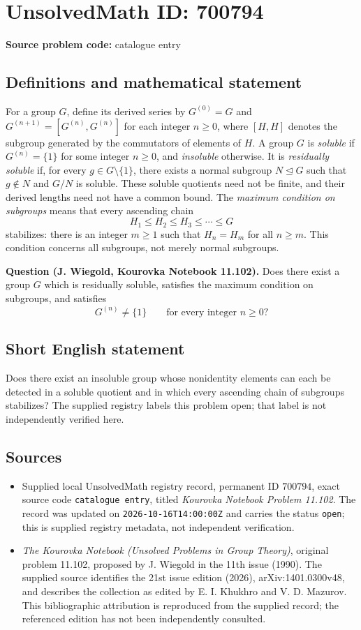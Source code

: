 \documentclass[11pt]{article}
\begin{document}
\section*{UnsolvedMath ID: 700794}
\textbf{Source problem code:} catalogue entry
\subsection{Definitions and mathematical statement}
For a group \(G\), define its derived series by \(G^{(0)}=G\) and \(G^{(n+1)}=[G^{(n)},G^{(n)}]\) for each integer \(n\geq 0\), where \([H,H]\) denotes the subgroup generated by the commutators of elements of \(H\). A group \(G\) is \emph{soluble} if \(G^{(n)}=\{1\}\) for some integer \(n\geq 0\), and \emph{insoluble} otherwise. It is \emph{residually soluble} if, for every \(g\in G\setminus\{1\}\), there exists a normal subgroup \(N\trianglelefteq G\) such that \(g\notin N\) and \(G/N\) is soluble. These soluble quotients need not be finite, and their derived lengths need not have a common bound. The \emph{maximum condition on subgroups} means that every ascending chain
\[
H_1\leq H_2\leq H_3\leq\cdots\leq G
\]
stabilizes: there is an integer \(m\geq 1\) such that \(H_n=H_m\) for all \(n\geq m\). This condition concerns all subgroups, not merely normal subgroups.

\textbf{Question (J. Wiegold, Kourovka Notebook 11.102).} Does there exist a group \(G\) which is residually soluble, satisfies the maximum condition on subgroups, and satisfies
\[
G^{(n)}\neq\{1\}\qquad\text{for every integer }n\geq 0?
\]
\subsection{Short English statement}
Does there exist an insoluble group whose nonidentity elements can each be detected in a soluble quotient and in which every ascending chain of subgroups stabilizes? The supplied registry labels this problem open; that label is not independently verified here.
\subsection{Sources}
\begin{itemize}
\item Supplied local UnsolvedMath registry record, permanent ID \(700794\), exact source code \texttt{catalogue entry}, titled \emph{Kourovka Notebook Problem 11.102}. The record was updated on \texttt{2026-10-16T14:00:00Z} and carries the status \texttt{open}; this is supplied registry metadata, not independent verification.
\item \emph{The Kourovka Notebook (Unsolved Problems in Group Theory)}, original problem 11.102, proposed by J. Wiegold in the 11th issue (1990). The supplied source identifies the 21st issue edition (2026), arXiv:1401.0300v48, and describes the collection as edited by E. I. Khukhro and V. D. Mazurov. This bibliographic attribution is reproduced from the supplied record; the referenced edition has not been independently consulted.
\end{itemize}
\end{document}
